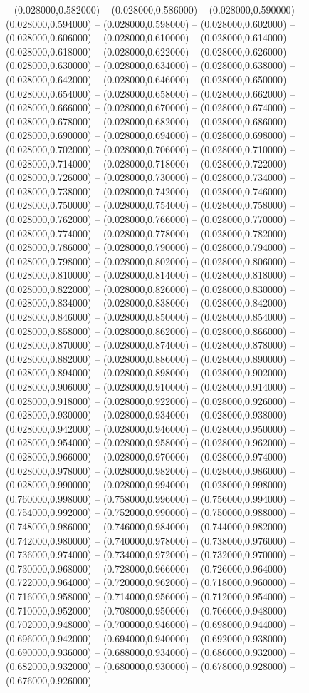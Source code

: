 -- (0.028000,0.582000) -- (0.028000,0.586000) -- (0.028000,0.590000) -- (0.028000,0.594000) -- (0.028000,0.598000) -- (0.028000,0.602000) -- (0.028000,0.606000) -- (0.028000,0.610000) -- (0.028000,0.614000) -- (0.028000,0.618000) -- (0.028000,0.622000) -- (0.028000,0.626000) -- (0.028000,0.630000) -- (0.028000,0.634000) -- (0.028000,0.638000) -- (0.028000,0.642000) -- (0.028000,0.646000) -- (0.028000,0.650000) -- (0.028000,0.654000) -- (0.028000,0.658000) -- (0.028000,0.662000) -- (0.028000,0.666000) -- (0.028000,0.670000) -- (0.028000,0.674000) -- (0.028000,0.678000) -- (0.028000,0.682000) -- (0.028000,0.686000) -- (0.028000,0.690000) -- (0.028000,0.694000) -- (0.028000,0.698000) -- (0.028000,0.702000) -- (0.028000,0.706000) -- (0.028000,0.710000) -- (0.028000,0.714000) -- (0.028000,0.718000) -- (0.028000,0.722000) -- (0.028000,0.726000) -- (0.028000,0.730000) -- (0.028000,0.734000) -- (0.028000,0.738000) -- (0.028000,0.742000) -- (0.028000,0.746000) -- (0.028000,0.750000) -- (0.028000,0.754000) -- (0.028000,0.758000) -- (0.028000,0.762000) -- (0.028000,0.766000) -- (0.028000,0.770000) -- (0.028000,0.774000) -- (0.028000,0.778000) -- (0.028000,0.782000) -- (0.028000,0.786000) -- (0.028000,0.790000) -- (0.028000,0.794000) -- (0.028000,0.798000) -- (0.028000,0.802000) -- (0.028000,0.806000) -- (0.028000,0.810000) -- (0.028000,0.814000) -- (0.028000,0.818000) -- (0.028000,0.822000) -- (0.028000,0.826000) -- (0.028000,0.830000) -- (0.028000,0.834000) -- (0.028000,0.838000) -- (0.028000,0.842000) -- (0.028000,0.846000) -- (0.028000,0.850000) -- (0.028000,0.854000) -- (0.028000,0.858000) -- (0.028000,0.862000) -- (0.028000,0.866000) -- (0.028000,0.870000) -- (0.028000,0.874000) -- (0.028000,0.878000) -- (0.028000,0.882000) -- (0.028000,0.886000) -- (0.028000,0.890000) -- (0.028000,0.894000) -- (0.028000,0.898000) -- (0.028000,0.902000) -- (0.028000,0.906000) -- (0.028000,0.910000) -- (0.028000,0.914000) -- (0.028000,0.918000) -- (0.028000,0.922000) -- (0.028000,0.926000) -- (0.028000,0.930000) -- (0.028000,0.934000) -- (0.028000,0.938000) -- (0.028000,0.942000) -- (0.028000,0.946000) -- (0.028000,0.950000) -- (0.028000,0.954000) -- (0.028000,0.958000) -- (0.028000,0.962000) -- (0.028000,0.966000) -- (0.028000,0.970000) -- (0.028000,0.974000) -- (0.028000,0.978000) -- (0.028000,0.982000) -- (0.028000,0.986000) -- (0.028000,0.990000) -- (0.028000,0.994000) -- (0.028000,0.998000) -- (0.760000,0.998000) -- (0.758000,0.996000) -- (0.756000,0.994000) -- (0.754000,0.992000) -- (0.752000,0.990000) -- (0.750000,0.988000) -- (0.748000,0.986000) -- (0.746000,0.984000) -- (0.744000,0.982000) -- (0.742000,0.980000) -- (0.740000,0.978000) -- (0.738000,0.976000) -- (0.736000,0.974000) -- (0.734000,0.972000) -- (0.732000,0.970000) -- (0.730000,0.968000) -- (0.728000,0.966000) -- (0.726000,0.964000) -- (0.722000,0.964000) -- (0.720000,0.962000) -- (0.718000,0.960000) -- (0.716000,0.958000) -- (0.714000,0.956000) -- (0.712000,0.954000) -- (0.710000,0.952000) -- (0.708000,0.950000) -- (0.706000,0.948000) -- (0.702000,0.948000) -- (0.700000,0.946000) -- (0.698000,0.944000) -- (0.696000,0.942000) -- (0.694000,0.940000) -- (0.692000,0.938000) -- (0.690000,0.936000) -- (0.688000,0.934000) -- (0.686000,0.932000) -- (0.682000,0.932000) -- (0.680000,0.930000) -- (0.678000,0.928000) -- (0.676000,0.926000) 